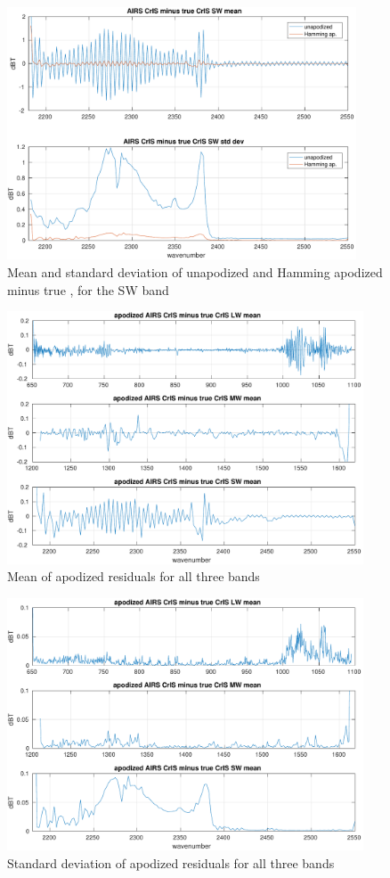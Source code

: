 \documentclass[11pt]{article}
\begin{document}
\begin{figure} %
  \centering
  \includegraphics[height=7.5cm]{figures/a2cris_diff_SW.pdf}
  \caption{Mean and standard deviation of unapodized and Hamming
    apodized {\airs} {\cris} minus true {\cris}, for the {\cris} SW
    band}
  \label{diffSW}
\end{figure}

\begin{figure} %
  \centering
  \includegraphics[height=7.5cm]{figures/combo_ap_dif_mean.pdf}
  \caption{Mean of apodized residuals for all three {\cris} bands}
  \label{meanAll}
\end{figure}

\begin{figure} %
  \centering
  \includegraphics[height=7.5cm]{figures/combo_ap_dif_std.pdf}
  \caption{Standard deviation of apodized residuals for all three
    {\cris} bands}
  \label{stdAll}
\end{figure}
\end{document}
